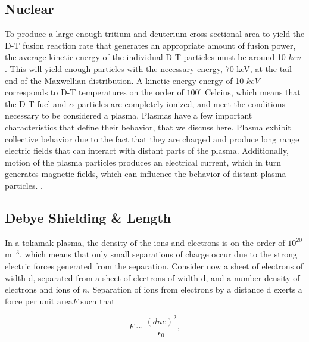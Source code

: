 \documentclass{article}
\begin{document}
\subsection{Nuclear}
To produce a large enough tritium and deuterium cross sectional area to yield the D-T fusion reaction rate that generates an appropriate amount of fusion power, the average kinetic energy of the individual D-T particles must be around 10 $kev$ \cite{Wesson}. This will yield enough particles with the necessary energy, $70$ keV, \cite{Chen} at the tail end of the Maxwellian distribution.  
A kinetic energy energy of 10 $keV$ corresponds to D-T temperatures on the order of $100^{\circ}$ Celcius, which means that the D-T fuel and $\alpha$ particles are completely ionized, and meet the conditions necessary to be considered a plasma.
Plasmas have a few important characteristics that define their behavior, that we discuss here. Plasma exhibit collective behavior due to the fact that they are charged and produce long range electric fields that can interact with distant parts of the plasma. Additionally, motion of the plasma particles produces an electrical current, which in turn generates magnetic fields, which can influence the behavior of distant plasma particles.   \cite{Chen}.


\subsection{Debye Shielding \& Length}
In a tokamak plasma, the density of the ions and electrons is on the order of $10^{20}$m$^{-3}$,  which means that only small separations of charge occur due to the strong electric forces generated from the separation. Consider now a sheet of electrons of width d, separated from a sheet of electrons of width d, and a number density of electrons and ions of $n$. Separation of ions from electrons by a distance d exerts a force per unit area$F$ such that 

$$F \sim \frac{(dne)^2}{\epsilon_0},$$
\end{document}
